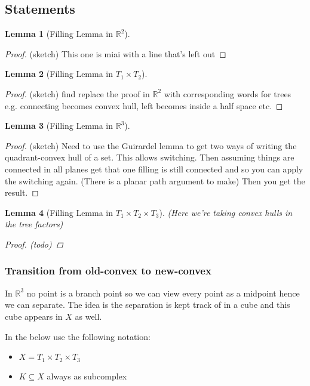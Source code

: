 \documentclass{article}
\theoremstyle{mystyle}
\newtheorem{lem}{Lemma}[section]
\theoremstyle{remark}
\begin{document}
\subsection{Statements}

\begin{lem}
    [Filling Lemma in \(\mathbb{R}^{2}\)]
\end{lem}
\begin{proof}
    (sketch) This one is miai with a line that's left out
\end{proof}
\begin{lem}
    [Filling Lemma in \(T_{1} \times T_{2}\)]
\end{lem}
\begin{proof}
    (sketch) find replace the proof in \(\mathbb{R}^{2}\) with corresponding words for trees e.g. connecting becomes convex hull, left becomes inside a half space etc.
\end{proof}
\begin{lem}
    [Filling Lemma in \(\mathbb{R}^{3}\)]
\end{lem}
\begin{proof}
    (sketch) Need to use the Guirardel lemma to get two ways of writing the quadrant-convex hull of a set. This allows switching. Then assuming things are connected in all planes get that one filling is still connected and so you can apply the switching again. (There is a planar path argument to make) Then you get the result.
\end{proof}
\begin{lem}
    [Filling Lemma in \(T_{1} \times T_{2} \times T_{3}\)]
    (Here we're taking convex hulls in the tree factors)
\begin{proof}
    (todo)
\end{proof}
\end{lem}

\subsubsection{Transition from old-convex to new-convex}

In \(\mathbb{R}^{3} \) no point is a branch point so we can view every point as a midpoint hence we can separate. The idea is the separation is kept track of in a cube and this cube appears in \(X\) as well. 

In the below use the following notation:
\begin{itemize}
	\item \(X=T_{1} \times T_{2} \times T_{3}\)
	\item \(K \subseteq X\) always as subcomplex
\end{itemize}
\end{document}
